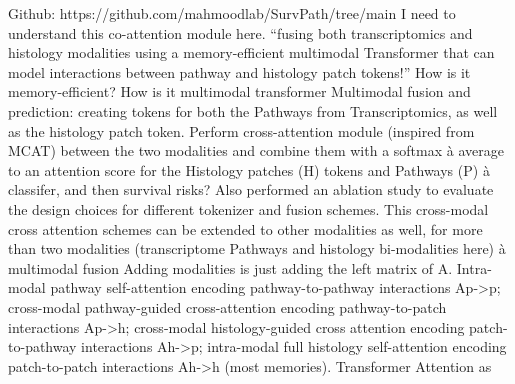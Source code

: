 \documentclass{article}%
\begin{document}
\newline%
\newline%
%
Github: https://github.com/mahmoodlab/SurvPath/tree/main%
\newline%
\newline%
%
I need to understand this co{-}attention module here.%
\newline%
\newline%
%
“fusing both transcriptomics and histology modalities using a memory{-}efficient multimodal Transformer that can model interactions between pathway and histology patch tokens!”%
\newline%
\newline%
%
How is it memory{-}efficient? How is it multimodal transformer %
\newline%
\newline%
%
%
\newline%
\newline%
%
Multimodal fusion and prediction: creating tokens for both the Pathways from Transcriptomics, as well as the histology patch token. Perform cross{-}attention module (inspired from MCAT) between the two modalities and combine them with a softmax à average to an attention score for the Histology patches (H) tokens and Pathways (P) à classifer, and then survival risks?%
\newline%
\newline%
%
Also performed an ablation study to evaluate the design choices for different tokenizer and fusion schemes. %
\newline%
\newline%
%
This cross{-}modal cross attention schemes can be extended to other modalities as well, for more than two modalities (transcriptome Pathways and histology bi{-}modalities here) à multimodal fusion %
\newline%
\newline%
%
%
\newline%
\newline%
%
Adding modalities is just adding the left matrix of A. %
\newline%
\newline%
%
Intra{-}modal pathway self{-}attention encoding pathway{-}to{-}pathway interactions Ap{-}>p; cross{-}modal pathway{-}guided cross{-}attention encoding pathway{-}to{-}patch interactions Ap{-}>h; cross{-}modal histology{-}guided cross attention encoding patch{-}to{-}pathway interactions Ah{-}>p; intra{-}modal full histology self{-}attention encoding patch{-}to{-}patch interactions Ah{-}>h (most memories). Transformer Attention as %
\newline%
\newline%
%
%
\newline%
\newline%
%
%
\newline%
\newline%
%
%
\newline%
\newline%
%
\end{document}
